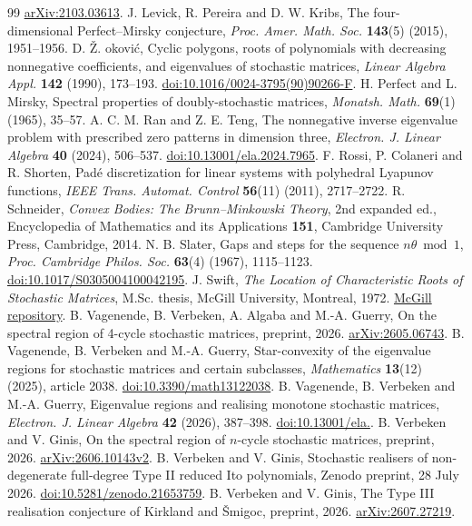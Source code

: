 \documentclass[11pt,a4paper]{article}
\theoremstyle{definition}
\theoremstyle{remark}
\numberwithin{equation}{section}
\begin{document}
\begin{thebibliography}{99}
\href{https://arxiv.org/abs/2103.03613}{arXiv:2103.03613}.
 J. Levick, R. Pereira and D. W. Kribs,
The four-dimensional Perfect--Mirsky conjecture,
\emph{Proc. Amer. Math. Soc.} \textbf{143}(5) (2015), 1951--1956.
 D. \v{Z}. \DJ{}okovi\'c,
Cyclic polygons, roots of polynomials with decreasing nonnegative coefficients, and eigenvalues of stochastic matrices,
\emph{Linear Algebra Appl.} \textbf{142} (1990), 173--193.
\href{https://doi.org/10.1016/0024-3795(90)90266-F}{doi:10.1016/0024-3795(90)90266-F}.
 H. Perfect and L. Mirsky,
Spectral properties of doubly-stochastic matrices,
\emph{Monatsh. Math.} \textbf{69}(1) (1965), 35--57.
 A. C. M. Ran and Z. E. Teng,
The nonnegative inverse eigenvalue problem with prescribed zero patterns in dimension three,
\emph{Electron. J. Linear Algebra} \textbf{40} (2024), 506--537.
\href{https://doi.org/10.13001/ela.2024.7965}{doi:10.13001/ela.2024.7965}.
 F. Rossi, P. Colaneri and R. Shorten,
Pad\'e discretization for linear systems with polyhedral Lyapunov functions,
\emph{IEEE Trans. Automat. Control} \textbf{56}(11) (2011), 2717--2722.
 R. Schneider,
\emph{Convex Bodies: The Brunn--Minkowski Theory}, 2nd expanded ed.,
Encyclopedia of Mathematics and its Applications \textbf{151},
Cambridge University Press, Cambridge, 2014.
 N. B. Slater,
Gaps and steps for the sequence $n\theta\bmod1$,
\emph{Proc. Cambridge Philos. Soc.} \textbf{63}(4) (1967), 1115--1123.
\href{https://doi.org/10.1017/S0305004100042195}{doi:10.1017/S0305004100042195}.
 J. Swift,
\emph{The Location of Characteristic Roots of Stochastic Matrices},
M.Sc. thesis, McGill University, Montreal, 1972.
\href{https://escholarship.mcgill.ca/concern/theses/12579t72d}{McGill repository}.
 B. Vagenende, B. Verbeken, A. Algaba and M.-A. Guerry,
On the spectral region of 4-cycle stochastic matrices, preprint, 2026.
\href{https://arxiv.org/abs/2605.06743}{arXiv:2605.06743}.
 B. Vagenende, B. Verbeken and M.-A. Guerry,
Star-convexity of the eigenvalue regions for stochastic matrices and certain subclasses,
\emph{Mathematics} \textbf{13}(12) (2025), article 2038.
\href{https://doi.org/10.3390/math13122038}{doi:10.3390/math13122038}.
 B. Vagenende, B. Verbeken and M.-A. Guerry,
Eigenvalue regions and realising monotone stochastic matrices,
\emph{Electron. J. Linear Algebra} \textbf{42} (2026), 387--398.
\href{https://doi.org/10.13001/ela.2026.10159}{doi:10.13001/ela.}.
 B. Verbeken and V. Ginis,
On the spectral region of $n$-cycle stochastic matrices, preprint, 2026.
\href{https://arxiv.org/abs/2606.10143v2}{arXiv:2606.10143v2}.
 B. Verbeken and V. Ginis,
Stochastic realisers of non-degenerate full-degree Type II reduced Ito polynomials,
Zenodo preprint, 28 July 2026.
\href{https://doi.org/10.5281/zenodo.21653759}{doi:10.5281/zenodo.21653759}.
 B. Verbeken and V. Ginis,
The Type III realisation conjecture of Kirkland and \v{S}migoc,
preprint, 2026.
\href{https://arxiv.org/abs/2607.27219}{arXiv:2607.27219}.
\end{thebibliography}

\end{document}
